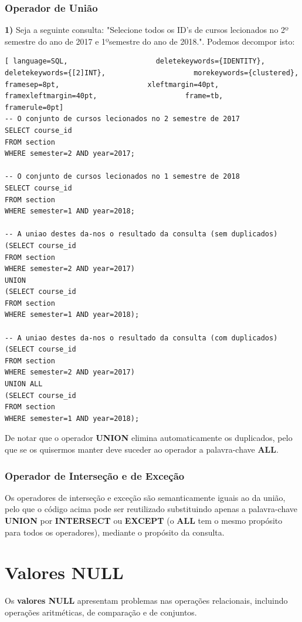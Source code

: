 \documentclass[titlepage]{book}
\theoremstyle{definition}
\begin{document}
\subsubsection{Operador de União}
\textbf{1)} Seja a seguinte consulta: "Selecione todos os ID's de cursos lecionados no 2º semestre do ano de 2017 e 1ºsemestre do ano de 2018.". Podemos decompor isto:
\begin{lstlisting}[ language=SQL,                     deletekeywords={IDENTITY},                     deletekeywords={[2]INT},                     morekeywords={clustered},                     framesep=8pt,                     xleftmargin=40pt,                     framexleftmargin=40pt,                     frame=tb,                     framerule=0pt]
-- O conjunto de cursos lecionados no 2 semestre de 2017
SELECT course_id
FROM section
WHERE semester=2 AND year=2017;

-- O conjunto de cursos lecionados no 1 semestre de 2018
SELECT course_id
FROM section
WHERE semester=1 AND year=2018;

-- A uniao destes da-nos o resultado da consulta (sem duplicados)
(SELECT course_id
FROM section
WHERE semester=2 AND year=2017)
UNION
(SELECT course_id
FROM section
WHERE semester=1 AND year=2018);

-- A uniao destes da-nos o resultado da consulta (com duplicados)
(SELECT course_id
FROM section
WHERE semester=2 AND year=2017)
UNION ALL
(SELECT course_id
FROM section
WHERE semester=1 AND year=2018);
\end{lstlisting}

De notar que o operador \textbf{UNION} elimina automaticamente os duplicados, pelo que se os quisermos manter deve suceder ao operador a palavra-chave \textbf{ALL}.

\subsubsection{Operador de Interseção e de Exceção}
Os operadores de interseção e exceção são semanticamente iguais ao da união, pelo que o código acima pode ser reutilizado substituindo apenas a palavra-chave \textbf{UNION} por \textbf{INTERSECT} ou \textbf{EXCEPT} (o \textbf{ALL} tem o mesmo propósito para todos os operadores), mediante o propósito da consulta.

\section{Valores NULL}
Os \textbf{valores NULL} apresentam problemas nas operações relacionais, incluindo operações aritméticas, de comparação e de conjuntos.
\end{document}
